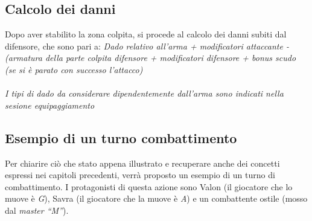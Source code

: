\documentclass[../manuale_main.tex]{subfiles}
\begin{document}
\subsection{Calcolo dei danni}
Dopo aver stabilito la zona colpita, si procede al calcolo dei danni subiti dal difensore, che sono pari a: \textit{Dado relativo all'arma + modificatori attaccante - (armatura della parte colpita difensore + modificatori difensore + bonus scudo (se si è parato con successo l'attacco)}\\\mbox{}\\
\emph{I tipi di dado da considerare dipendentemente dall'arma sono indicati nella sesione equipaggiamento}


\subsection{Esempio di un turno combattimento}
Per chiarire ciò che  stato appena illustrato e recuperare anche dei concetti espressi nei capitoli precedenti, verrà proposto un esempio di un turno di combattimento. I protagonisti di questa azione sono Valon (il giocatore che lo muove è \emph{G}), Savra  (il giocatore che la muove è \emph{A}) e un combattente ostile (mosso dal \emph{master ``M''}).
\clearpage 
\end{document}
